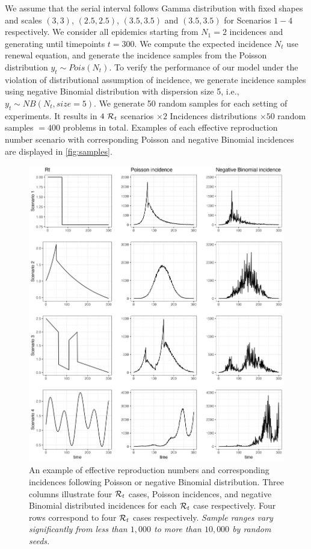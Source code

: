 We assume that the serial interval follows Gamma distribution with fixed shapes and scales $(3,3)$, $(2.5,2.5)$, $(3.5,3.5)$ and $(3.5,3.5)$ for Scenarios $1-4$ respectively. We consider all epidemics starting from $N_1=2$ incidences and generating until timepoints $t=300$. We compute the expected incidence $N_t$ use renewal equation, and generate the incidence samples from the Poisson distribution $y_t\sim Pois(N_t)$. 
To verify the performance of our model under the violation of distributional assumption of incidence, we generate incidence samples using negative Binomial distribution with dispersion size 5, i.e., $y_t\sim NB(N_t, {size=}5)$. We generate 50 random samples for each setting of experiments. It results in $4\ \mathcal{R}_t$ scenarios $\times 2$ Incidences distributions $\times 50$ random samples $= 400$ problems in total. 
Examples of each effective reproduction number scenario with corresponding
Poisson and negative Binomial incidences are displayed in \autoref{fig:samples}. 

\begin{figure}[hp!]
    \centering
    \includegraphics[width=.9\textwidth]{fig/plot_samples.png}
    \caption{An example of effective reproduction numbers and corresponding incidences following Poisson or negative Binomial distribution. Three columns illustrate four $\mathcal{R}_t$ cases, Poisson incidences, and negative Binomial distributed incidences for each $\mathcal{R}_t$ case respectively. Four rows correspond to four $\mathcal{R}_t$ cases respectively. \textit{Sample ranges vary significantly from less than $1,000$ to more than $10,000$ by random seeds.} } 
    \label{fig:samples}
\end{figure}

